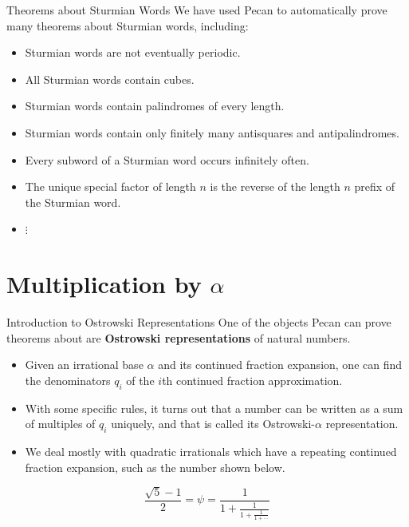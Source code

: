 \documentclass[leqno,presentation,usenames,dvipsnames]{beamer}
\begin{document}
\begin{frame}{Theorems about Sturmian Words}
    We have used Pecan to automatically prove many theorems about Sturmian words, including:
    \begin{itemize}
        \item Sturmian words are not eventually periodic.
        \item All Sturmian words contain cubes.
        \item Sturmian words contain palindromes of every length.
        \item Sturmian words contain only finitely many antisquares and antipalindromes.
        \item Every subword of a Sturmian word occurs infinitely often.
        \item The unique special factor of length $n$ is the reverse of the length $n$ prefix of the Sturmian word.
        \item $\vdots$
    \end{itemize}
\end{frame}

\section{Multiplication by $\alpha$}
\begin{frame}{Introduction to Ostrowski Representations}
    One of the objects Pecan can prove theorems about are \textbf{Ostrowski representations} of natural numbers.
    \begin{itemize}
        \item Given an irrational base $\alpha$ and its continued fraction expansion, one can find the denominators $q_i$ of the $i$th continued fraction approximation.
        
        \item With some specific rules, it turns out that a number can be written as a sum of multiples of $q_i$ uniquely, and that is called its Ostrowski-$\alpha$ representation.
        
        \item We deal mostly with quadratic irrationals which have a repeating continued fraction expansion, such as the number shown below.
    \end{itemize}
    $$\frac {\sqrt 5 - 1} 2 = \psi = \frac 1 {1 + \frac 1 {1 + \frac 1 {1+\cdots} } }$$
\end{frame}
\end{document}
